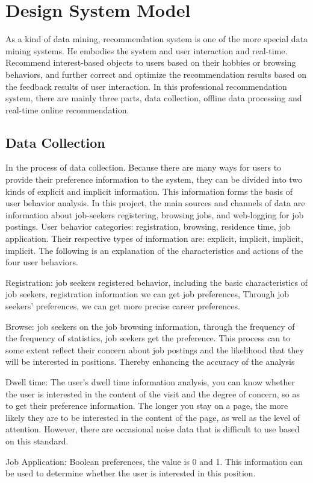 \documentclass[sigconf]{acmart}
\begin{document}
\section{Design System Model}
As a kind of data mining, recommendation system is one of the more special data mining systems. He embodies the system and user interaction and real-time. Recommend interest-based objects to users based on their hobbies or browsing behaviors, and further correct and optimize the recommendation results based on the feedback results of user interaction. In this professional recommendation system, there are mainly three parts, data collection, offline data processing and real-time online recommendation.

\subsection{Data Collection}
In the process of data collection. Because there are many ways for users to provide their preference information to the system, they can be divided into two kinds of explicit and implicit information. This information forms the basis of user behavior analysis. In this project, the main sources and channels of data are information about job-seekers registering, browsing jobs, and web-logging for job postings. User behavior categories: registration, browsing, residence time, job application. Their respective types of information are: explicit, implicit, implicit, implicit. The following is an explanation of the characteristics and actions of the four user behaviors.
\par Registration: job seekers registered behavior, including the basic characteristics of job seekers, registration information we can get job preferences,
Through job seekers' preferences, we can get more precise career preferences.
\par Browse: job seekers on the job browsing information, through the frequency of the frequency of statistics, job seekers get the preference. This process can to some extent reflect their concern about job postings and the likelihood that they will be interested in positions. Thereby enhancing the accuracy of the analysis
\par Dwell time: The user's dwell time information analysis, you can know whether the user is interested in the content of the visit and the degree of concern, so as to get their preference information. The longer you stay on a page, the more likely they are to be interested in the content of the page, as well as the level of attention. However, there are occasional noise data that is difficult to use based on this standard.
\par Job Application: Boolean preferences, the value is 0 and 1. This information can be used to determine whether the user is interested in this position.
\end{document}
